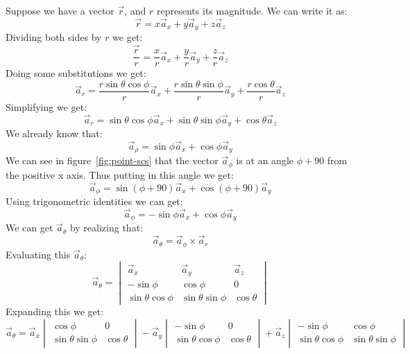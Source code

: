             Suppose we have a vector $\vec{r}$, and $r$ represents its magnitude. We can write it as:
            $$\vec{r} = x\vec{a}_x + y\vec{a}_y + z\vec{a}_z$$
            Dividing both sides by $r$ we get:
            $$\frac{\vec{r}}{r} = \frac{x}{r}\vec{a}_x + \frac{y}{r}\vec{a}_y + \frac{z}{r}\vec{a}_z$$
            Doing some substitutions we get:
            $$\vec{a}_r = \frac{r\sin\theta\cos\phi}{r}\vec{a}_x + \frac{r\sin\theta\sin\phi}{r}\vec{a}_y + \frac{r\cos\theta}{r}\vec{a}_z$$
            Simplifying we get:
            $$\vec{a}_r = \sin\theta\cos\phi\vec{a}_x + 
             \sin\theta\sin\phi\vec{a}_y +
             \cos\theta\vec{a}_z 
            $$
            We already know that:
            $$\vec{a}_\rho = \sin\phi\vec{a}_x + \cos\phi\vec{a}_y$$
            We can see in figure~\ref{fig:point-scs} that the vector $\vec{a}_\phi$ is at an angle $\phi + 90$ from the positive x axis. Thus putting in this angle we get:
            $$\vec{a}_\phi = \sin\left(\phi + 90\right)\vec{a}_x + \cos\left(\phi + 90\right)\vec{a}_y$$
            Using trigonometric identities we can get:
            $$\vec{a}_\phi = -\sin\phi\vec{a}_x + \cos\phi\vec{a}_y$$
            We can get $\vec{a}_\theta$ by realizing that:
            $$\vec{a}_\theta = \vec{a}_\phi \times \vec{a}_r$$
            Evaluating this $\vec{a}_\theta$:
            $$\vec{a}_\theta = 
                \begin{vmatrix}
                    \vec{a}_x & \vec{a}_y & \vec{a}_z \\
                    -\sin\phi & \cos\phi & 0 \\
                    \sin\theta\cos\phi & \sin\theta\sin\phi & \cos\theta 
                \end{vmatrix}$$
            Expanding this we get:
            $$
                \vec{a}_\theta = 
                \vec{a}_x\begin{vmatrix}
                    \cos\phi & 0 \\
                    \sin\theta\sin\phi & \cos\theta
                \end{vmatrix} - 
                \vec{a}_y\begin{vmatrix}
                   -\sin\phi & 0 \\
                   \sin\theta\cos\phi & \cos\theta 
                \end{vmatrix} + 
                \vec{a}_z\begin{vmatrix}
                   -\sin\phi & \cos\phi \\
                   \sin\theta\cos\phi & \sin\theta\sin\phi 
                \end{vmatrix}
            $$
